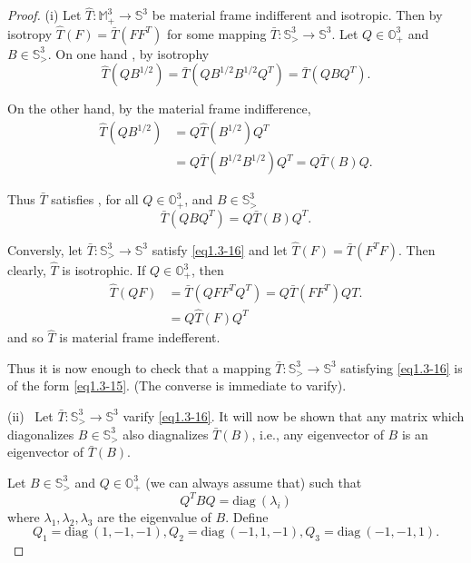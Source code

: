  \begin{proof}
   (i) Let $\hat{T}: \mathbb{M}^3_+ \to \mathbb{S}^3$ be material frame
   indifferent and isotropic. Then by isotropy $\hat{T}(F)=
   \bar{T}(FF^T)$ for some mapping $\bar{T}: \mathbb{S}^3_> \to
   \mathbb{S}^3$. Let $Q \in \mathbb{O}^3_+$ and $B \in
   \mathbb{S}^3_>$. On one hand , by isotrophy 
   $$
   \hat{T}(QB^{1/2})= \bar{T}(QB^{1/2}B^{1/2}Q^T) = \bar{T}(QBQ^T). 
   $$ 

   On the other hand, by the material frame indifference, 
   \begin{align*}
     \hat{T}(QB^{1/2}) &= Q \hat{T}(B^{1/2}) Q^T\\
     &=Q \bar{T}(B^{1/2} B^{1/2}) Q^T= Q \bar{T}(B) Q. 
   \end{align*} \pageoriginale
   
   Thus $\bar{T}$ satisfies , for all $Q \in \mathbb{O}^3_+$, and $B \in
   \mathbb{S}^3_>$ 
   \begin{equation*}
     \bar{T}(QBQ^T)= Q \bar{T}(B)Q^T. \tag{1.3-16}\label{eq1.3-16}
   \end{equation*} 
   
   Conversly, let $\bar{T}: \mathbb{S}^3_> \to \mathbb{S}^3$ satisfy
   \eqref{eq1.3-16} and let $\hat{T}(F)= \bar{T}(F^TF)$. Then clearly,
   $\hat{T}$ is isotrophic. If $Q \in \mathbb{O}^3_+$, then  
   \begin{align*}
     \hat{T}(QF)&= \bar{T}(QFF^TQ^T) = Q \bar{T}(FF^T) QT. \\
     &= Q \hat{T}(F) Q^T
   \end{align*} 
   and so $\hat{T}$ is material frame indefferent. 
   
   Thus it is now enough to check that a mapping $\bar{T}: \mathbb{S}^3_>
   \to \mathbb{S}^3$ satisfying \eqref{eq1.3-16} is of the form
   \eqref{eq1.3-15}. (The converse is immediate to varify).  

\medskip   
 (ii)~ Let $\bar{T}: \mathbb{S}^3_> \to \mathbb{S}^3$ varify
   \eqref{eq1.3-16}. It will now be shown that any matrix which
   diagonalizes $B \in \mathbb{S}^3_>$ also diagnalizes
   $\bar{T}(B)$, i.e., any  eigenvector of $B$ is an eigenvector of
   $\bar{T}(B)$.   
   
   Let $B \in \mathbb{S}^3_>$ and $Q \in \mathbb{O}^3_+$ (we can always
   assume that) such that  
   $$
   Q^T BQ = \text{diag}~ (\lambda_i)
   $$
   where $\lambda_1, \lambda_2, \lambda_3$ are the eigenvalue of $B$. Define
   $$
   Q_1 = \text{diag}~ (1, -1, -1), Q_2 = \text{diag}~  (-1, 1, -1),
   Q_3= \text{diag}~ (-1, -1, 1).  
   $$


\end{proof}
